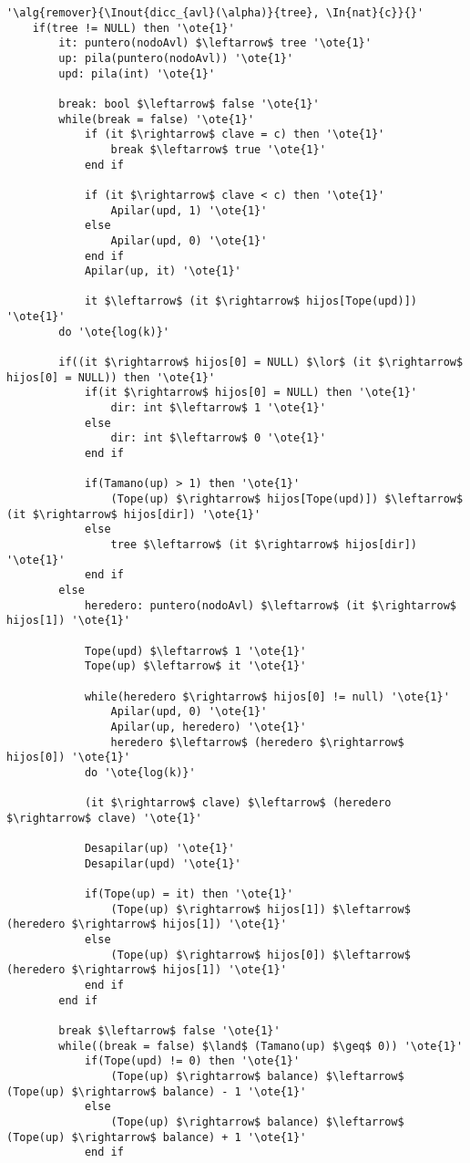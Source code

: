 \begin{lstlisting}[mathescape]
'\alg{remover}{\Inout{dicc_{avl}(\alpha)}{tree}, \In{nat}{c}}{}'
	if(tree != NULL) then '\ote{1}'
		it: puntero(nodoAvl) $\leftarrow$ tree '\ote{1}'
		up: pila(puntero(nodoAvl)) '\ote{1}'
		upd: pila(int) '\ote{1}'
		
		break: bool $\leftarrow$ false '\ote{1}'
		while(break = false) '\ote{1}'
			if (it $\rightarrow$ clave = c) then '\ote{1}'
				break $\leftarrow$ true '\ote{1}'
			end if

			if (it $\rightarrow$ clave < c) then '\ote{1}'
				Apilar(upd, 1) '\ote{1}'
			else
				Apilar(upd, 0) '\ote{1}'
			end if
			Apilar(up, it) '\ote{1}'
			
			it $\leftarrow$ (it $\rightarrow$ hijos[Tope(upd)]) '\ote{1}'
		do '\ote{log(k)}'

		if((it $\rightarrow$ hijos[0] = NULL) $\lor$ (it $\rightarrow$ hijos[0] = NULL)) then '\ote{1}'
			if(it $\rightarrow$ hijos[0] = NULL) then '\ote{1}'
				dir: int $\leftarrow$ 1 '\ote{1}'
			else
				dir: int $\leftarrow$ 0 '\ote{1}'
			end if
			
			if(Tamano(up) > 1) then '\ote{1}'
				(Tope(up) $\rightarrow$ hijos[Tope(upd)]) $\leftarrow$ (it $\rightarrow$ hijos[dir]) '\ote{1}'
			else
				tree $\leftarrow$ (it $\rightarrow$ hijos[dir]) '\ote{1}'
			end if
		else
			heredero: puntero(nodoAvl) $\leftarrow$ (it $\rightarrow$ hijos[1]) '\ote{1}'
			
			Tope(upd) $\leftarrow$ 1 '\ote{1}'
			Tope(up) $\leftarrow$ it '\ote{1}'
			
			while(heredero $\rightarrow$ hijos[0] != null) '\ote{1}'
				Apilar(upd, 0) '\ote{1}'
				Apilar(up, heredero) '\ote{1}'
				heredero $\leftarrow$ (heredero $\rightarrow$ hijos[0]) '\ote{1}'
			do '\ote{log(k)}'
		
			(it $\rightarrow$ clave) $\leftarrow$ (heredero $\rightarrow$ clave) '\ote{1}'

			Desapilar(up) '\ote{1}'
			Desapilar(upd) '\ote{1}'

			if(Tope(up) = it) then '\ote{1}'
				(Tope(up) $\rightarrow$ hijos[1]) $\leftarrow$ (heredero $\rightarrow$ hijos[1]) '\ote{1}'
			else
				(Tope(up) $\rightarrow$ hijos[0]) $\leftarrow$ (heredero $\rightarrow$ hijos[1]) '\ote{1}'
			end if
		end if
	
		break $\leftarrow$ false '\ote{1}'
		while((break = false) $\land$ (Tamano(up) $\geq$ 0)) '\ote{1}'
			if(Tope(upd) != 0) then '\ote{1}'
				(Tope(up) $\rightarrow$ balance) $\leftarrow$ (Tope(up) $\rightarrow$ balance) - 1 '\ote{1}'
			else
				(Tope(up) $\rightarrow$ balance) $\leftarrow$ (Tope(up) $\rightarrow$ balance) + 1 '\ote{1}'
			end if


\end{lstlisting}

